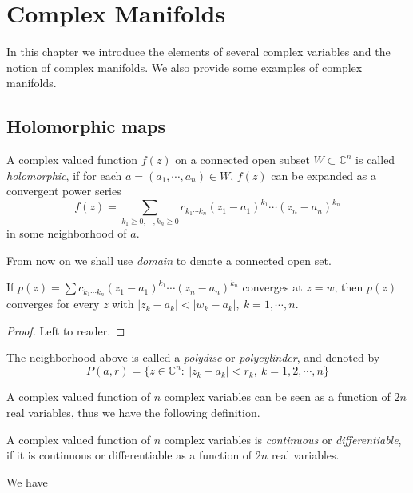 \chapter{Complex Manifolds}

In this chapter we introduce the elements of several complex variables and the notion of complex manifolds.
We also provide some examples of complex ma\-nifolds.

\section{Holomorphic maps}

\begin{defn}
    A complex valued function $f(z)$ on a connected open subset $W\subset\mathbb{C}^n$ is called \emph{holomorphic}, if for each $a=(a_1,\cdots,a_n)\in W$, $f(z)$ can be expanded as a convergent power series
    \[f(z)=\sum_{k_1\geq 0,\cdots,k_n\geq 0}c_{k_1\cdots k_n}(z_1-a_1)^{k_1}\cdots(z_n-a_n)^{k_n}\]
    in some neighborhood of $a$.
\end{defn}

From now on we shall use \emph{domain} to denote a connected open set.

\begin{prop}
    If $p(z)=\sum c_{k_1\cdots k_n}(z_1-a_1)^{k_1}\cdots(z_n-a_n)^{k_n}$ converges at $z=w$, then $p(z)$ converges for every $z$ with $|z_k-a_k|<|w_k-a_k|,\ k=1,\cdots,n$.
\end{prop}
\begin{proof}
    Left to reader.
\end{proof}

\begin{defn}
    The neighborhood above is called a \emph{polydisc} or \emph{polycylinder}, and denoted by 
    \[P(a,r)=\{z\in\mathbb{C}^n:\ |z_k-a_k|<r_k,\ k=1,2,\cdots,n\}\]
\end{defn}

A complex valued function of $n$ complex variables can be seen as a function of $2n$ real variables, thus we have the following definition.
\begin{defn}
    A complex valued function of $n$ complex variables is \emph{continuous} or \emph{differentiable}, if it is continuous or differentiable as a function of $2n$ real variables.
\end{defn}

We have

